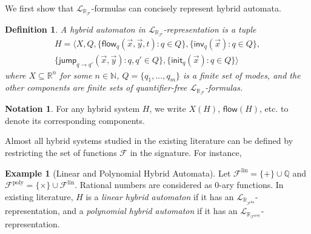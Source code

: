 \documentclass[10pt]{article}
\theoremstyle{plain}
\newtheorem{definition}[theorem]{Definition}
\theoremstyle{definition}
\newtheorem{example}[theorem]{Example}
\newtheorem{notation}[theorem]{Notation}
\newcommand{\flow}{\mathsf{flow}}
\newcommand{\jump}{\mathsf{jump}}
\newcommand{\inv}{\mathsf{inv}}
\newcommand{\init}{\mathsf{init}}
\newcommand{\lrf}{\mathcal{L}_{\mathbb{R}_{\mathcal{F}}}}
\begin{document}
We first show that $\lrf$-formulas can concisely represent hybrid automata.
\begin{definition}\label{lrf-definition}
A hybrid automaton in $\lrf$-representation is a tuple
\begin{multline*}
H = \langle X, Q, \{{\flow}_q(\vec x, \vec y, t): q\in Q\},\{\inv_q(\vec x): q\in Q\},\\
\{\jump_{q\rightarrow q'}(\vec x, \vec y): q,q'\in Q\},\{\init_q(\vec x): q\in Q\}\rangle
\end{multline*}
where $X\subseteq \mathbb{R}^n$ for some $n\in \mathbb{N}$, $Q=\{q_1,...,q_m\}$ is a finite set of modes, and the other components are finite sets of quantifier-free $\lrf$-formulas.
\end{definition}
\begin{notation}
For any hybrid system $H$, we write $X(H)$, $\flow(H)$, etc. to denote its corresponding components.
\end{notation}
Almost all hybrid systems studied in the existing literature can be defined by restricting the set of functions $\mathcal{F}$ in the signature. For instance,
\begin{example}[Linear and Polynomial Hybrid Automata] Let $\mathcal{F}^{\mathrm{lin}} = \{+\}\cup \mathbb{Q}$ and $\mathcal{F}^{\mathrm{poly}}=\{\times\}\cup\mathcal{F}^{\mathrm{lin}}$. Rational numbers are considered as 0-ary functions. In existing literature, $H$ is a {\em linear hybrid automaton} if it has an $\mathcal{L}_{\mathbb{R}_{\mathcal{F}^{\mathrm{lin}}}}$-representation, and a {\em polynomial hybrid automaton} if it has an $\mathcal{L}_{\mathbb{R}_{\mathcal{F}^{\mathrm{poly}}}}$-representation.
\end{example}
\end{document}
